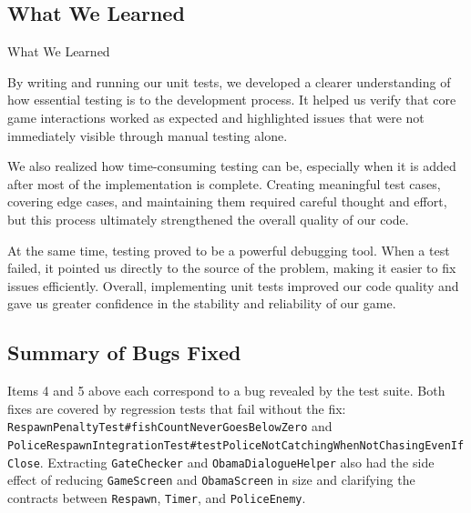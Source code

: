 \documentclass[12pt]{article}
\begin{document}
\subsection{What We Learned}

What We Learned

By writing and running our unit tests, we developed a clearer understanding of how essential testing is to the development process. It helped us verify that core game interactions worked as expected and highlighted issues that were not immediately visible through manual testing alone.

We also realized how time-consuming testing can be, especially when it is added after most of the implementation is complete. Creating meaningful test cases, covering edge cases, and maintaining them required careful thought and effort, but this process ultimately strengthened the overall quality of our code.

At the same time, testing proved to be a powerful debugging tool. When a test failed, it pointed us directly to the source of the problem, making it easier to fix issues efficiently. Overall, implementing unit tests improved our code quality and gave us greater confidence in the stability and reliability of our game.

\subsection{Summary of Bugs Fixed}

Items 4 and 5 above each correspond to a bug revealed by the test suite. Both fixes are covered by regression tests that fail without the fix: \texttt{RespawnPenaltyTest\#fishCountNeverGoesBelowZero} and \texttt{PoliceRespawnIntegrationTest\#testPoliceNotCatchingWhenNotChasingEvenIfClose}. Extracting \texttt{GateChecker} and \texttt{ObamaDialogueHelper} also had the side effect of reducing \texttt{GameScreen} and \texttt{ObamaScreen} in size and clarifying the contracts between \texttt{Respawn}, \texttt{Timer}, and \texttt{PoliceEnemy}.

\end{document}
